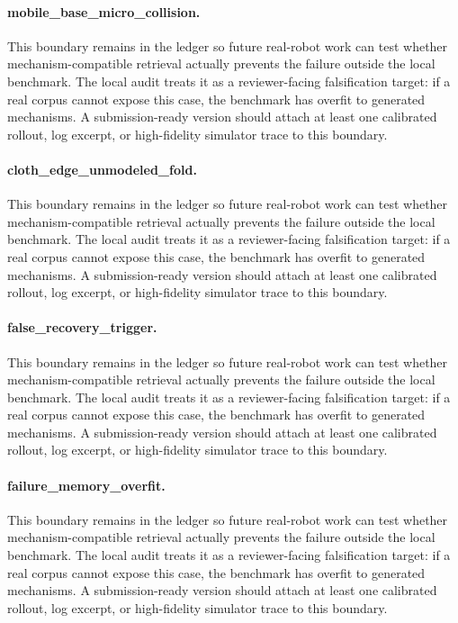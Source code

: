 \documentclass{article}
\begin{document}
\paragraph{mobile\_base\_micro\_collision.} This boundary remains in the ledger so future real-robot work can test whether mechanism-compatible retrieval actually prevents the failure outside the local benchmark. The local audit treats it as a reviewer-facing falsification target: if a real corpus cannot expose this case, the benchmark has overfit to generated mechanisms. A submission-ready version should attach at least one calibrated rollout, log excerpt, or high-fidelity simulator trace to this boundary.
\paragraph{cloth\_edge\_unmodeled\_fold.} This boundary remains in the ledger so future real-robot work can test whether mechanism-compatible retrieval actually prevents the failure outside the local benchmark. The local audit treats it as a reviewer-facing falsification target: if a real corpus cannot expose this case, the benchmark has overfit to generated mechanisms. A submission-ready version should attach at least one calibrated rollout, log excerpt, or high-fidelity simulator trace to this boundary.
\paragraph{false\_recovery\_trigger.} This boundary remains in the ledger so future real-robot work can test whether mechanism-compatible retrieval actually prevents the failure outside the local benchmark. The local audit treats it as a reviewer-facing falsification target: if a real corpus cannot expose this case, the benchmark has overfit to generated mechanisms. A submission-ready version should attach at least one calibrated rollout, log excerpt, or high-fidelity simulator trace to this boundary.
\paragraph{failure\_memory\_overfit.} This boundary remains in the ledger so future real-robot work can test whether mechanism-compatible retrieval actually prevents the failure outside the local benchmark. The local audit treats it as a reviewer-facing falsification target: if a real corpus cannot expose this case, the benchmark has overfit to generated mechanisms. A submission-ready version should attach at least one calibrated rollout, log excerpt, or high-fidelity simulator trace to this boundary.
\end{document}

